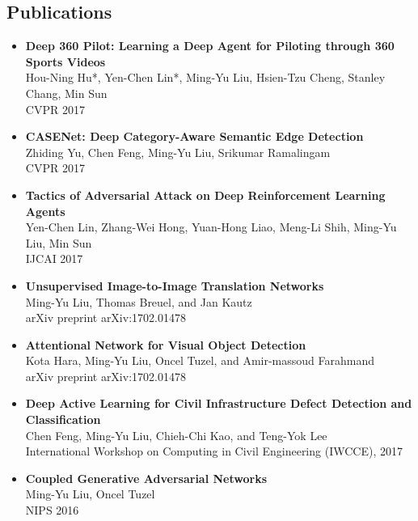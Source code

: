 \documentclass[10pt,letterpaper]{article}
\begin{document}
\subsection*{Publications}
\begin{itemize}
\item {\bf Deep 360 Pilot: Learning a Deep Agent for Piloting through 360 Sports Videos}\\
      Hou-Ning Hu*, Yen-Chen Lin*, Ming-Yu Liu, Hsien-Tzu Cheng, Stanley Chang, Min Sun\\
      CVPR 2017\vspace{-2mm}
\item {\bf CASENet: Deep Category-Aware Semantic Edge Detection}\\
      Zhiding Yu, Chen Feng, Ming-Yu Liu, Srikumar Ramalingam\\
      CVPR 2017\vspace{-2mm}
\item {\bf Tactics of Adversarial Attack on Deep Reinforcement Learning Agents}\\
      Yen-Chen Lin, Zhang-Wei Hong, Yuan-Hong Liao, Meng-Li Shih, Ming-Yu Liu, Min Sun\\
      IJCAI 2017\vspace{-2mm}      
\item {\bf Unsupervised Image-to-Image Translation Networks}\\
      Ming-Yu Liu, Thomas Breuel, and Jan Kautz\\
      arXiv preprint arXiv:1702.01478\vspace{-2mm}
\item {\bf Attentional Network for Visual Object Detection}\\
      Kota Hara, Ming-Yu Liu, Oncel Tuzel, and Amir-massoud Farahmand\\
      arXiv preprint arXiv:1702.01478\vspace{-2mm}
\item {\bf Deep Active Learning for Civil Infrastructure Defect Detection and Classification}\\
      Chen Feng, Ming-Yu Liu, Chieh-Chi Kao, and Teng-Yok Lee\\
      International Workshop on Computing in Civil Engineering (IWCCE), 2017\vspace{-2mm}
\item {\bf Coupled Generative Adversarial Networks}\\
      Ming-Yu Liu, Oncel Tuzel\\
      NIPS 2016\vspace{-2mm}

\end{itemize}
\end{document}

